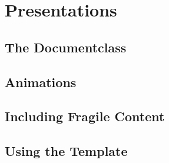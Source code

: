 \section{Presentations}

\subsection{The  Documentclass}
\begin{frame}

\end{frame}

\subsection{Animations}
\begin{frame}

\end{frame}

\subsection{Including Fragile Content}
\begin{frame}

\end{frame}

\subsection{Using the  Template}
\begin{frame}

\end{frame}